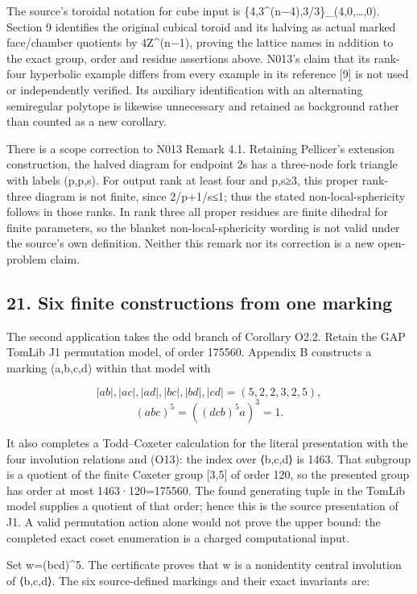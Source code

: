 \documentclass[
  10pt,
  letterpaper,
]{article}
\begin{document}
The source's toroidal notation for cube input is
\{4,3\^{}(n−4),3/3\}\_(4,0,\ldots,0). Section 9 identifies the original
cubical toroid and its halving as actual marked face/chamber quotients
by 4Z\^{}(n−1), proving the lattice names in addition to the exact
group, order and residue assertions above. N013's claim that its
rank-four hyperbolic example differs from every example in its reference
{[}9{]} is not used or independently verified. Its auxiliary
identification with an alternating semiregular polytope is likewise
unnecessary and retained as background rather than counted as a new
corollary.

There is a scope correction to N013 Remark 4.1. Retaining Pellicer's
extension construction, the halved diagram for endpoint 2s has a
three-node fork triangle with labels (p,p,s). For output rank at least
four and p,s≥3, this proper rank-three diagram is not finite, since
2/p+1/s≤1; thus the stated non-local-sphericity follows in those ranks.
In rank three all proper residues are finite dihedral for finite
parameters, so the blanket non-local-sphericity wording is not valid
under the source's own definition. Neither this remark nor its
correction is a new open-problem claim.

\subsection{21. Six finite constructions from one
marking}\label{six-finite-constructions-from-one-marking}

The second application takes the odd branch of Corollary O2.2. Retain
the GAP TomLib J1 permutation model, of order 175560. Appendix B
constructs a marking (a,b,c,d) within that model with

\[
|ab|,|ac|,|ad|,|bc|,|bd|,|cd|=(5,2,2,3,2,5),
\] \[
(abc)^5=((dcb)^5a)^3=1.
\tag{O13}
\]

It also completes a Todd--Coxeter calculation for the literal
presentation with the four involution relations and (O13): the index
over ⟨b,c,d⟩ is 1463. That subgroup is a quotient of the finite Coxeter
group {[}3,5{]} of order 120, so the presented group has order at most
1463·120=175560. The found generating tuple in the TomLib model supplies
a quotient of that order; hence this is the source presentation of J1. A
valid permutation action alone would not prove the upper bound: the
completed exact coset enumeration is a charged computational input.

Set w=(bcd)\^{}5. The certificate proves that w is a nonidentity central
involution of ⟨b,c,d⟩. The six source-defined markings and their exact
invariants are:
\end{document}

